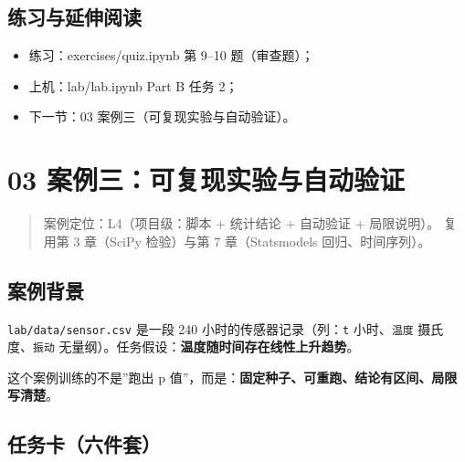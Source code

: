 \subsection{练习与延伸阅读}\label{ux7ec3ux4e60ux4e0eux5ef6ux4f38ux9605ux8bfb-4}

\begin{itemize}
\tightlist
\item
  练习：exercises/quiz.ipynb 第 9--10 题（审查题）；
\item
  上机：lab/lab.ipynb Part B 任务 2；
\item
  下一节：03 案例三（可复现实验与自动验证）。
\end{itemize}

\section{03
案例三：可复现实验与自动验证}\label{ux6848ux4f8bux4e09ux53efux590dux73b0ux5b9eux9a8cux4e0eux81eaux52a8ux9a8cux8bc1}

\begin{quote}
案例定位：L4（项目级：脚本 + 统计结论 + 自动验证 + 局限说明）。 复用第 3
章（SciPy 检验）与第 7 章（Statsmodels 回归、时间序列）。
\end{quote}

\subsection{案例背景}\label{ux6848ux4f8bux80ccux666f-6}

\texttt{lab/data/sensor.csv} 是一段 240 小时的传感器记录（列：\texttt{t}
小时、\texttt{温度} 摄氏度、\texttt{振动}
无量纲）。任务假设：\textbf{温度随时间存在线性上升趋势}。

这个案例训练的不是''跑出 p
值''，而是：\textbf{固定种子、可重跑、结论有区间、局限写清楚}。

\subsection{任务卡（六件套）}\label{ux4efbux52a1ux5361ux516dux4ef6ux5957-2}

